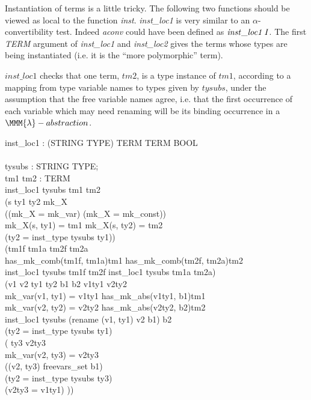 \documentclass[a4paper,11pt,titlepage]{article}
\begin{document}
\begin{titlepage}
Instantiation of terms is a little tricky.
The following two functions should be viewed as
local to the function {\it inst}.
{\it inst\_loc1} is very similar to an
$\alpha$-convertibility test. Indeed {\it aconv} could
have been defined as $\it inst\_loc1\,I$.
The first {\it TERM} argument of {\it inst\_loc1}
and {\it inst\_loc2}
gives the terms whose types are being instantiated (i.e.
it is the ``more polymorphic'' term).

$inst\_loc1$ checks that one term, $tm2$, is a type
instance of $tm1$, according to a mapping from
type variable names to types given by $tysubs$,
under the assumption that the free variable names
agree, i.e. that the first occurrence of each variable which
may need renaming will be its binding occurrence in
a $\MMM{\lambda}-abstraction$.
\begin{HOLConst}
\+	\PrNL{}inst\_loc1\PrNN{} : (STRING \MMM{\rightarrow} TYPE) \MMM{\rightarrow} TERM \MMM{\rightarrow} TERM \MMM{\rightarrow} BOOL\\
\PrPH{}
\+	\MMM{\forall}\\
\+	tysubs : STRING \MMM{\rightarrow} TYPE;\\
\+	tm1 tm2 : TERM\MMM{\bullet}\\
\+	inst\_loc1 tysubs tm1 tm2 \MMM{\Leftrightarrow}\\
\+		(\MMM{\exists}s ty1 ty2 mk\_X\MMM{\bullet}\\
\+			((mk\_X = mk\_var) \MMM{\lor} (mk\_X = mk\_const))\\
\+		\MMM{\land}	mk\_X(s, ty1) = tm1 \MMM{\land} mk\_X(s, ty2) = tm2\\
\+		\MMM{\land}	(ty2 = inst\_type tysubs ty1))\\
\+	\MMM{\lor}	(\MMM{\exists}tm1f tm1a tm2f tm2a\MMM{\bullet}\\
\+			has\_mk\_comb(tm1f, tm1a)tm1 \MMM{\land} has\_mk\_comb(tm2f, tm2a)tm2\\
\+		\MMM{\land}	inst\_loc1 tysubs tm1f tm2f \MMM{\land} inst\_loc1 tysubs tm1a tm2a)\\
\+	\MMM{\lor}	(\MMM{\exists}v1 v2 ty1 ty2 b1 b2 v1ty1 v2ty2 \MMM{\bullet}\\
\+			mk\_var(v1, ty1) = v1ty1 \MMM{\land} has\_mk\_abs(v1ty1, b1)tm1\\
\+		\MMM{\land}	mk\_var(v2, ty2) = v2ty2 \MMM{\land} has\_mk\_abs(v2ty2, b2)tm2\\
\+		\MMM{\land}	inst\_loc1 tysubs (rename (v1, ty1) v2 b1) b2\\
\+		\MMM{\land}	(ty2 = inst\_type tysubs ty1)\\
\+		\MMM{\land}	\MMM{\lnot}(\MMM{\exists} ty3 v2ty3 \MMM{\bullet}\\
\+				mk\_var(v2, ty3) = v2ty3\\
\+			\MMM{\land}	((v2, ty3) \MMM{\in} freevars\_set b1)\\
\+			\MMM{\land}	(ty2 = inst\_type tysubs ty3)\\
\+			\MMM{\land}	(\MMM{\lnot}v2ty3 = v1ty1) ))\\
\end{HOLConst}


\end{titlepage}
\end{document}

